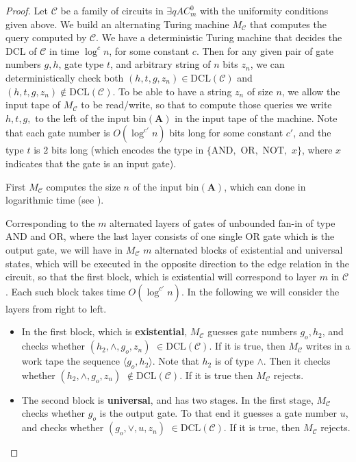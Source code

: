 \documentclass{article}
\begin{document}
\begin{proof}
Let $\mathcal{C}$ be a family of circuits in $\exists qAC^0_{m}$ with the uniformity conditions given above. We build an alternating Turing machine $M_{\mathcal{C}}$ that computes the query computed by $\mathcal{C}$. We have a deterministic Turing machine that decides the $\mathrm{DCL}$ of $\mathcal{C}$ in time $\log^{c} n$, for some constant $c$. Then  for any given pair of gate numbers $g, h$, gate type $t$, and arbitrary string of $n$ bits $z_{n}$, we can deterministically check both $(h,t,g,z_n) \in \mathrm{DCL(\mathcal{C})}$ and $(h,t,g,z_n) \not\in \mathrm{DCL(\mathcal{C})}$. To be able to have a string $z_n$ of size $n$, we allow the input tape of $M_{\mathcal{C}}$ to be read/write, so that to compute those queries we write   $h,t,g,$ to the left of the input $\mathrm{bin}(\mathbf{A})$ in the input tape of the machine. Note that each gate number is $O(\log^{c'} n)$ bits long for some constant $c'$, and the type $t$ is $2$ bits long (which encodes the type in $\{\mathrm{AND},$ $\mathrm{OR},$ $\mathrm{NOT},$ $x\}$, where $x$ indicates that the gate is an input gate).

First $M_{\mathcal{C}}$ computes the size $n$ of the input $\mathrm{bin}(\mathbf{A})$, which can done in logarithmic time (see \cite{barrington:jcss1990}).

Corresponding to the $m$ alternated layers of  gates of unbounded fan-in of type $\mathrm{AND}$ and $\mathrm{OR}$, where the last layer consists of one single $\mathrm{OR}$ gate which is the output gate, we will have in $M_{\mathcal{C}}$ $m$ alternated blocks of existential and universal states, which will be executed in the opposite direction to the edge relation in the circuit, so that the first block, which is existential will correspond to layer $m$ in $\mathcal{C}$. Each such block  takes time $O(\log^{c'} n)$. In the following we will consider the layers from right to left.
\begin{itemize}
 \item
In the first block, which is \textbf{existential}, $M_{\mathcal{C}}$ guesses gate numbers $g_{o}, h_{2}$, and checks whether $(h_{2}, \wedge, g_{o}, z_n)$ $\in \mathrm{DCL(\mathcal{C})}$. If it is true, then $M_{\mathcal{C}}$ writes in a work tape the sequence $\langle g_{o}, h_{2}\rangle$.
Note that $h_{2}$ is of type $\wedge$. Then it checks
whether $(h_{2}, \wedge, g_{o},  z_n)$ $\not\in \mathrm{DCL(\mathcal{C})}$. If it is true then $M_{\mathcal{C}}$ rejects.

 \item
The second block is \textbf{universal}, and has two stages. In the first stage, $M_{\mathcal{C}}$ checks whether $g_{o}$ is the output gate. To that end it guesses a gate number $u$, and checks whether $(g_{o}, \vee, u,  z_n)$ $\in \mathrm{DCL(\mathcal{C})}$. If it is true, then $M_{\mathcal{C}}$ rejects.


\end{itemize}
\end{proof}
\end{document}
